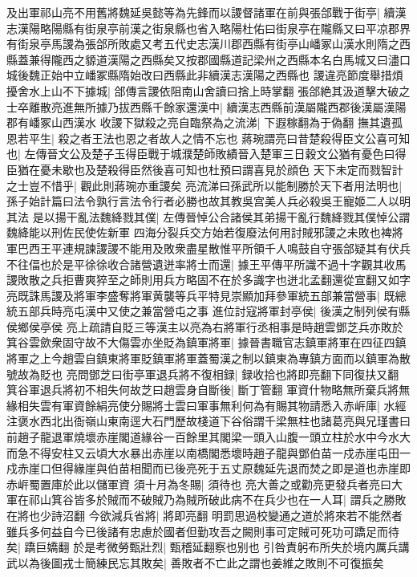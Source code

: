 及出軍祁山亮不用舊將魏延吳懿等為先鋒而以謖督諸軍在前與張郃戰于街亭|{
	續漢志漢陽略陽縣有街泉亭前漢之街泉縣也省入略陽杜佑曰街泉亭在隴縣又曰平凉郡界有街泉亭馬謖為張郃所敗處又考五代史志漢川郡西縣有街亭山嶓冢山漢水則隋之西縣蓋兼得隴西之䝠道漢陽之西縣矣又按郡國縣道記梁州之西縣本名白馬城又曰濜口城後魏正始中立嶓冢縣隋始改曰西縣此非續漢志漢陽之西縣也}
謖違亮節度舉措煩擾舍水上山不下據城|{
	郃傳言謖依阻南山舍讀曰捨上時掌翻}
張郃絶其汲道擊大破之士卒離散亮進無所據乃拔西縣千餘家還漢中|{
	續漢志西縣前漢屬隴西郡後漢屬漢陽郡有嶓冢山西漢水}
收謖下獄殺之亮自臨祭為之流涕|{
	下遐稼翻為于偽翻}
撫其遺孤恩若平生|{
	殺之者王法也恩之者故人之情不忘也}
蔣琬謂亮曰昔楚殺得臣文公喜可知也|{
	左傳晉文公及楚子玉得臣戰于城濮楚師敗績晉入楚軍三日穀文公猶有憂色曰得臣猶在憂未歇也及楚殺得臣然後喜可知也杜預曰謂喜見於顔色}
天下未定而戮智計之士豈不惜乎|{
	觀此則蔣琬亦重謖矣}
亮流涕曰孫武所以能制勝於天下者用法明也|{
	孫子始計篇曰法令孰行言法令行者必勝也故其教吳宫美人兵必殺吳王寵姬二人以明其法}
是以揚干亂法魏絳戮其僕|{
	左傳晉悼公合諸侯其弟揚干亂行魏絳戮其僕悼公謂魏絳能以刑佐民使佐新軍}
四海分裂兵交方始若復廢法何用討賊邪謖之未敗也裨將軍巴西王平連規諫謖謖不能用及敗衆盡星散惟平所領千人鳴鼓自守張郃疑其有伏兵不往偪也於是平徐徐收合諸營遺迸率將士而還|{
	據王平傳平所識不過十字觀其收馬謖敗散之兵拒曹爽猝至之師則用兵方略固不在於多識字也迸北孟翻還從宣翻又如字}
亮既誅馬謖及將軍李盛奪將軍黄襲等兵平特見崇顯加拜參軍統五部兼當營事|{
	既總統五部兵時亮屯漢中又使之兼當營屯之事}
進位討寇將軍封亭侯|{
	後漢之制列侯有縣侯鄉侯亭侯}
亮上疏請自貶三等漢主以亮為右將軍行丞相事是時趙雲鄧芝兵亦敗於箕谷雲歛衆固守故不大傷雲亦坐貶為鎮軍將軍|{
	據晉書職官志鎮軍將軍在四征四鎮將軍之上今趙雲自鎮東將軍貶鎮軍將軍蓋蜀漢之制以鎮東為專鎮方面而以鎮軍為散號故為貶也}
亮問鄧芝曰街亭軍退兵將不復相録|{
	録收拾也將即亮翻下同復扶又翻}
箕谷軍退兵將初不相失何故芝曰趙雲身自斷後|{
	斷丁管翻}
軍資什物略無所棄兵將無緣相失雲有軍資餘絹亮使分賜將士雲曰軍事無利何為有賜其物請悉入赤㟁庫|{
	水經注褒水西北出衙嶺山東南逕大石門歷故棧道下谷俗謂千梁無柱也諸葛亮與兄瑾書曰前趙子龍退軍燒壞赤崖閣道緣谷一百餘里其閣梁一頭入山腹一頭立柱於水中今水大而急不得安柱又云頃大水暴出赤崖以南橋閣悉壞時趙子龍與鄧伯苗一戍赤崖屯田一戍赤崖口但得緣崖與伯苗相聞而已後亮死于五丈原魏延先退而焚之即是道也赤崖即赤㟁蜀置庫於此以儲軍資}
須十月為冬賜|{
	須待也}
亮大善之或勸亮更發兵者亮曰大軍在祁山箕谷皆多於賊而不破賊乃為賊所破此病不在兵少也在一人耳|{
	謂兵之勝敗在將也少詩沼翻}
今欲減兵省將|{
	將即亮翻}
明罰思過校變通之道於將來若不能然者雖兵多何益自今已後諸有忠慮於國者但勤攻吾之闕則事可定賊可死功可蹻足而待矣|{
	蹻巨嬌翻}
於是考微勞甄壯烈|{
	甄稽延翻察也别也}
引咎責躬布所失於境内厲兵講武以為後圖戎士簡練民忘其敗矣|{
	善敗者不亡此之謂也姜維之敗則不可復振矣}
